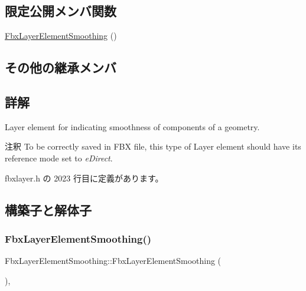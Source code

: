 \subsection*{限定公開メンバ関数}
\begin{DoxyCompactItemize}
\item 
\hyperlink{class_fbx_layer_element_smoothing_a3821d7b7a1de97865516aa3937290d82}{Fbx\+Layer\+Element\+Smoothing} ()
\end{DoxyCompactItemize}
\subsection*{その他の継承メンバ}


\subsection{詳解}
Layer element for indicating smoothness of components of a geometry. \begin{DoxyRemark}{注釈}
To be correctly saved in F\+BX file, this type of Layer element should have its reference mode set to {\itshape e\+Direct}. 
\end{DoxyRemark}


 fbxlayer.\+h の 2023 行目に定義があります。



\subsection{構築子と解体子}
\mbox{\label{class_fbx_layer_element_smoothing_a3821d7b7a1de97865516aa3937290d82}} 
\subsubsection{\texorpdfstring{Fbx\+Layer\+Element\+Smoothing()}{FbxLayerElementSmoothing()}}
{\footnotesize\ttfamily Fbx\+Layer\+Element\+Smoothing\+::\+Fbx\+Layer\+Element\+Smoothing (\begin{DoxyParamCaption}{ }\end{DoxyParamCaption})\hspace{0.3cm}{\ttfamily [inline]}, {\ttfamily [protected]}}



